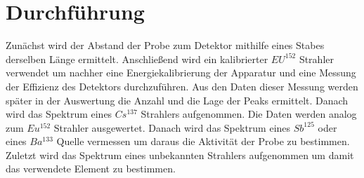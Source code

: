 
\section{Durchführung}
\label{sec:Durchführung}
Zunächst wird der Abstand der Probe zum Detektor mithilfe eines Stabes derselben Länge ermittelt. Anschließend wird ein kalibrierter $EU^{152}$ Strahler verwendet um nachher eine Energiekalibrierung der Apparatur und eine Messung der Effizienz des Detektors durchzuführen. Aus den Daten dieser Messung werden später in der Auswertung die Anzahl und die Lage der Peaks ermittelt. Danach wird das Spektrum eines $Cs^{137}$ Strahlers aufgenommen. Die Daten werden analog zum $Eu^{152}$ Strahler ausgewertet. Danach wird das Spektrum eines $Sb^{125}$ oder eines $Ba^{133}$ Quelle vermessen um daraus die Aktivität der Probe zu bestimmen. Zuletzt wird das Spektrum eines unbekannten Strahlers aufgenommen um damit das verwendete Element zu bestimmen.